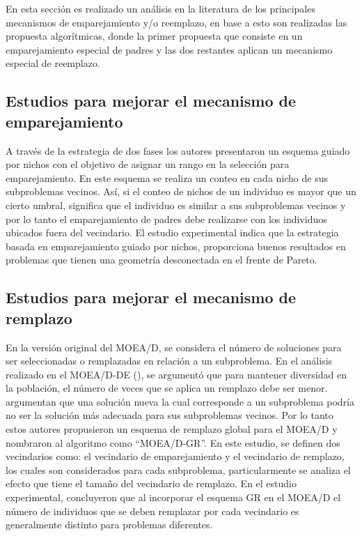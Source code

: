 En esta sección es realizado un análisis en la literatura de los principales mecanismos de emparejamiento y/o reemplazo, en base a esto son realizadas las propuesta algorítmicas, donde la primer propuesta que consiste en un emparejamiento especial de padres y las dos restantes aplican un mecanismo especial de reemplazo.

\subsection*{Estudios para mejorar el mecanismo de emparejamiento}

A través de la estrategia de dos fases los autores \cite{jiang2016improved} presentaron un esquema guiado por nichos con el objetivo de asignar un rango en la selección para emparejamiento.
%
En este esquema se realiza un conteo en cada nicho de sus subproblemas vecinos. 
%
Así, si el conteo de nichos de un individuo es mayor que un cierto umbral, significa que el individuo es similar a sus subproblemas vecinos y por lo tanto el emparejamiento de padres debe realizarse con los individuos ubicados fuera del vecindario.
%
El estudio experimental indica que la estrategia basada en emparejamiento guiado por nichos, proporciona buenos resultados en problemas que tienen una geometría desconectada en el frente de Pareto.
%

\subsection*{Estudios para mejorar el mecanismo de remplazo}

En la versión original del MOEA/D, se considera el número de soluciones para ser seleccionadas o remplazadas en relación a un subproblema.
%
En el análisis realizado en el MOEA/D-DE (\cite{li2009multiobjective}), se argumentó que para mantener diversidad en la población, el número de veces que se aplica un remplazo debe ser menor.
%
\citeauthor{wang2014replacement} argumentan que una solución nueva la cual corresponde a un subproblema podría no ser la solución más adecuada para sus subproblemas vecinos. 
%
Por lo tanto estos autores propusieron un esquema de remplazo global para el MOEA/D y nombraron al algoritmo como ``MOEA/D-GR''.
%
En este estudio, se definen dos vecindarios como: el vecindario de emparejamiento y el vecindario de remplazo, los cuales son considerados para cada subproblema, particularmente se analiza el efecto que tiene el tamaño del vecindario de remplazo.
%
En el estudio experimental, concluyeron que al incorporar el esquema GR en el MOEA/D el número de individuos que se deben remplazar por cada vecindario es generalmente distinto para problemas diferentes.


